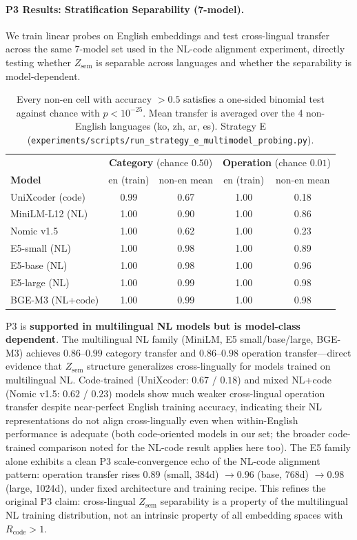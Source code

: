 \documentclass[11pt]{article}
\theoremstyle{definition}
\newcommand{\Zsem}{Z_{\text{sem}}}
\begin{document}
\paragraph{P3 Results: Stratification Separability (7-model).}
We train linear probes on English embeddings and test cross-lingual transfer across the same 7-model set used in the NL-code alignment experiment, directly testing whether $\Zsem$ is separable across languages and whether the separability is model-dependent.

\begin{table}[h]
\centering
\small
\begin{tabular}{lcc|cc}
\toprule
& \multicolumn{2}{c|}{\textbf{Category} (chance $0.50$)} & \multicolumn{2}{c}{\textbf{Operation} (chance $0.01$)} \\
\textbf{Model} & en (train) & non-en mean & en (train) & non-en mean \\
\midrule
UniXcoder (code)   & 0.99 & 0.67 & 1.00 & 0.18 \\
MiniLM-L12 (NL)    & 1.00 & 0.90 & 1.00 & 0.86 \\
Nomic v1.5         & 1.00 & 0.62 & 1.00 & 0.23 \\
E5-small (NL)      & 1.00 & 0.98 & 1.00 & 0.89 \\
E5-base (NL)       & 1.00 & 0.98 & 1.00 & 0.96 \\
E5-large (NL)      & 1.00 & 0.99 & 1.00 & 0.98 \\
BGE-M3 (NL+code)   & 1.00 & 0.99 & 1.00 & 0.98 \\
\bottomrule
\end{tabular}
\caption*{\small Every non-en cell with accuracy $> 0.5$ satisfies a one-sided binomial test against chance with $p < 10^{-25}$. Mean transfer is averaged over the 4 non-English languages (ko, zh, ar, es). Strategy E (\texttt{experiments/scripts/run\_strategy\_e\_multimodel\_probing.py}).}
\end{table}

P3 is \textbf{supported in multilingual NL models but is model-class dependent}. The multilingual NL family (MiniLM, E5 small/base/large, BGE-M3) achieves $0.86$--$0.99$ category transfer and $0.86$--$0.98$ operation transfer---direct evidence that $\Zsem$ structure generalizes cross-lingually for models trained on multilingual NL. Code-trained (UniXcoder: $0.67$ / $0.18$) and mixed NL+code (Nomic v1.5: $0.62$ / $0.23$) models show much weaker cross-lingual operation transfer despite near-perfect English training accuracy, indicating their NL representations do not align cross-lingually even when within-English performance is adequate (both code-oriented models in our set; the broader code-trained comparison noted for the NL-code result applies here too). The E5 family alone exhibits a clean P3 scale-convergence echo of the NL-code alignment pattern: operation transfer rises $0.89$ (small, 384d) $\to 0.96$ (base, 768d) $\to 0.98$ (large, 1024d), under fixed architecture and training recipe. This refines the original P3 claim: cross-lingual $\Zsem$ separability is a property of the multilingual NL training distribution, not an intrinsic property of all embedding spaces with $R_{\text{code}} > 1$.
\end{document}

